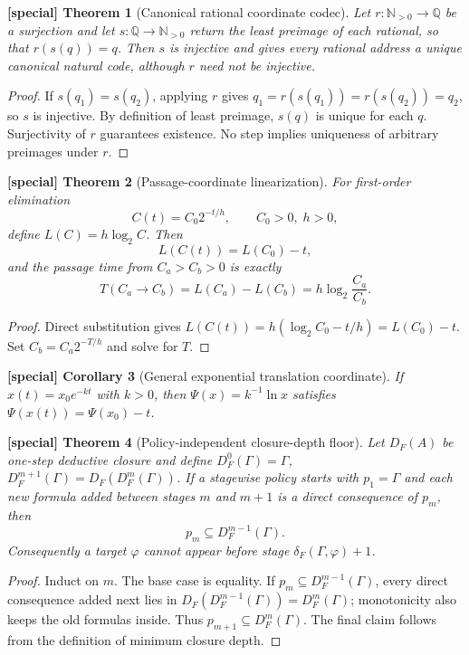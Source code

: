 \documentclass[11pt]{article}
\theoremstyle{special}
\newtheorem{specialthm}{[special] Theorem}[section]
\newtheorem{specialcor}[specialthm]{[special] Corollary}
\theoremstyle{definition}
\newcommand{\Nat}{\mathbb N}
\newcommand{\Rat}{\mathbb Q}
\begin{document}
\begin{specialthm}[Canonical rational coordinate codec]
Let $r:\Nat_{>0}\to\Rat$ be a surjection and let $s:\Rat\to\Nat_{>0}$ return the least preimage of each rational, so that $r(s(q))=q$. Then $s$ is injective and gives every rational address a unique canonical natural code, although $r$ need not be injective.
\end{specialthm}
\begin{proof}
If $s(q_1)=s(q_2)$, applying $r$ gives $q_1=r(s(q_1))=r(s(q_2))=q_2$, so $s$ is injective. By definition of least preimage, $s(q)$ is unique for each $q$. Surjectivity of $r$ guarantees existence. No step implies uniqueness of arbitrary preimages under $r$.\qedhere
\end{proof}

\begin{specialthm}[Passage-coordinate linearization]
For first-order elimination
\[
C(t)=C_0 2^{-t/h},\qquad C_0>0,\;h>0,
\]
define $L(C)=h\log_2 C$. Then
\[
L(C(t))=L(C_0)-t,
\]
and the passage time from $C_a>C_b>0$ is exactly
\[
T(C_a\to C_b)=L(C_a)-L(C_b)=h\log_2\!\frac{C_a}{C_b}.
\]
\end{specialthm}
\begin{proof}
Direct substitution gives
$L(C(t))=h(\log_2C_0-t/h)=L(C_0)-t$.
Set $C_b=C_a2^{-T/h}$ and solve for $T$.\qedhere
\end{proof}

\begin{specialcor}[General exponential translation coordinate]
If $x(t)=x_0e^{-kt}$ with $k>0$, then $\Psi(x)=k^{-1}\ln x$ satisfies $\Psi(x(t))=\Psi(x_0)-t$.
\end{specialcor}

\begin{specialthm}[Policy-independent closure-depth floor]
Let $D_F(A)$ be one-step deductive closure and define $D_F^0(\Gamma)=\Gamma$, $D_F^{m+1}(\Gamma)=D_F(D_F^m(\Gamma))$. If a stagewise policy starts with $p_1=\Gamma$ and each new formula added between stages $m$ and $m+1$ is a direct consequence of $p_m$, then
\[
p_m\subseteq D_F^{m-1}(\Gamma).
\]
Consequently a target $\varphi$ cannot appear before stage $\delta_F(\Gamma,\varphi)+1$.
\end{specialthm}
\begin{proof}
Induct on $m$. The base case is equality. If $p_m\subseteq D_F^{m-1}(\Gamma)$, every direct consequence added next lies in $D_F(D_F^{m-1}(\Gamma))=D_F^m(\Gamma)$; monotonicity also keeps the old formulas inside. Thus $p_{m+1}\subseteq D_F^m(\Gamma)$. The final claim follows from the definition of minimum closure depth.\qedhere
\end{proof}
\end{document}
